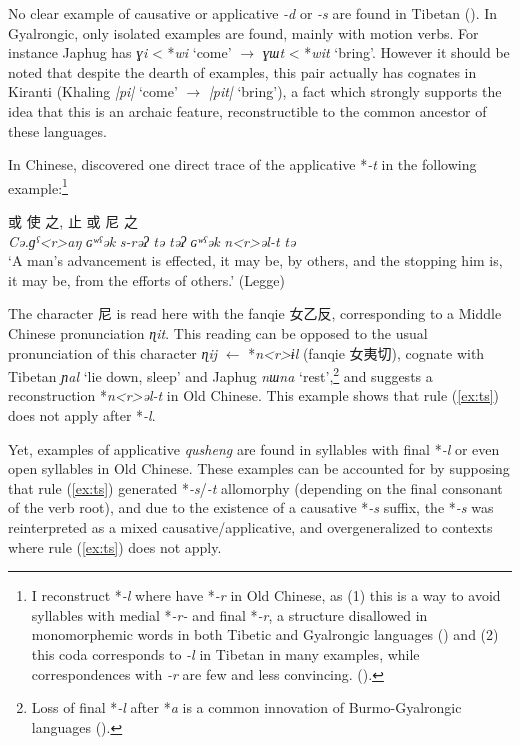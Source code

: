 \documentclass[oneside,a4paper,11pt]{article}
\newcommand{\ipa}[1]{{\phon\textit{\mbox{#1}}}}
\newcommand{\zh}[1]{{\cn#1}}
\begin{document}
No clear example of causative or applicative \ipa{-d} or \ipa{-s} are found in Tibetan (\citealt[630]{hill14derivational}). In Gyalrongic, only isolated examples are found, mainly with motion verbs. For instance Japhug has \ipa{ɣi} < *\ipa{wi} `come' $\rightarrow$ \ipa{ɣɯt} <  *\ipa{wit} `bring'. However it should be noted that despite  the dearth of examples, this pair actually has cognates in Kiranti (Khaling \ipa{|pi|} `come' $\rightarrow$ \ipa{|pit|} `bring'), a fact which strongly supports the idea that this is an archaic feature, reconstructible to the common ancestor of these languages.

In Chinese, \citet{sagart04directions} discovered one direct trace of the applicative *\ipa{-t}  in the following example:\footnote{I reconstruct *\ipa{-l} where \citet{bs14oc} have *\ipa{-r} in Old Chinese, as (1) this is a way to avoid syllables with medial *\ipa{-r-} and final *\ipa{-r}, a structure disallowed in monomorphemic words in both Tibetic and Gyalrongic languages (\citealt{jacques04these}) and (2) this coda corresponds to \ipa{-l}  in Tibetan in many examples, while correspondences with \ipa{-r} are few and less convincing. (\citealt[101-2]{hill14jrn}).  } 

 

\begin{exe}
\ex 
\gll \zh{行} \zh{或} \zh{使} \zh{之}, \zh{止} \zh{或} \zh{尼} \zh{之} \\
 \ipa{Cə.ɡˁ<r>aŋ}  \ipa{ɢʷˁək}  \ipa{s-rəʔ}  \ipa{tə}  \ipa{təʔ}  \ipa{ɢʷˁək}  \ipa{n<r>əl-t}  \ipa{tə} \\
\glt `A man's advancement is effected, it may be, by others, and the stopping him is, it may be, from the efforts of others.' (Legge)
\end{exe}

The character \zh{尼} is read here with the fanqie \zh{女乙反}, corresponding to a Middle Chinese pronunciation \ipa{ɳit}. This reading can be opposed to the usual pronunciation of this character \ipa{ɳij} $\leftarrow$ *\ipa{n<r>ɨl}  (fanqie \zh{女夷切}), cognate with Tibetan \ipa{ɲal} `lie down, sleep' and Japhug \ipa{nɯna} `rest',\footnote{Loss of final *\ipa{-l} after *\ipa{a} is a common innovation of Burmo-Gyalrongic languages (\citealt{jacques.michaud11naish}).} and suggests a reconstruction *\ipa{n<r>əl-t} in Old Chinese. This example shows that rule (\ref{ex:ts}) does not apply after *\ipa{-l}.

 Yet, examples of applicative \textit{qusheng} are found in syllables with final *\ipa{-l} or even open syllables in Old Chinese. These examples can be accounted for by supposing that rule (\ref{ex:ts}) generated *\ipa{-s}/\ipa{-t} allomorphy (depending on the final consonant of the verb root), and due to the existence of a causative *\ipa{-s} suffix, the *\ipa{-s} was reinterpreted as a mixed causative/applicative, and overgeneralized to contexts where rule (\ref{ex:ts}) does not apply.
 
\end{document}
